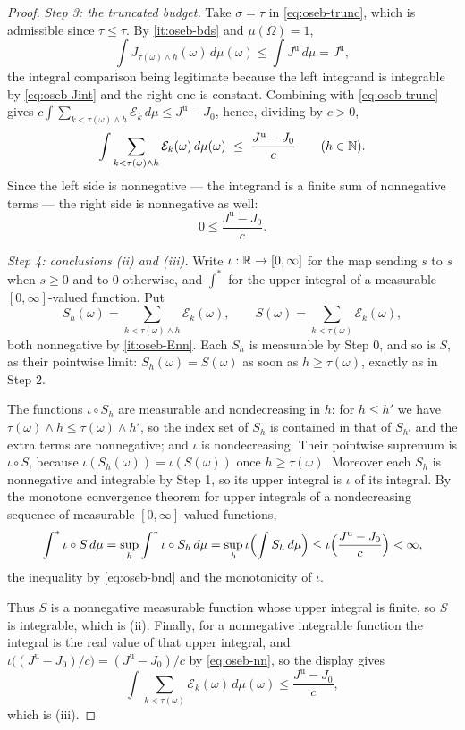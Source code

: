 \begin{proof}
\emph{Step 3: the truncated budget.} Take $\sigma=\tau$ in
\eqref{eq:oseb-trunc}, which is admissible since $\tau\le\tau$. By
\ref{it:oseb-bds} and $\mu(\Omega)=1$,
\[
  \int J_{\tau(\omega)\wedge h}(\omega)\,d\mu(\omega)
   \le\int J^{\mathrm u}\,d\mu=J^{\mathrm u},
\]
the integral comparison being legitimate because the left integrand is
integrable by \eqref{eq:oseb-Jint} and the right one is constant. Combining
with \eqref{eq:oseb-trunc} gives
$c\int\sum_{k<\tau(\omega)\wedge h}\mathcal E_k\,d\mu\le J^{\mathrm u}-J_0$,
hence, dividing by $c>0$,
\begin{equation}\label{eq:oseb-bnd}
  \int\sum_{k<\tau(\omega)\wedge h}\mathcal E_k(\omega)\,d\mu(\omega)
   \ \le\ \frac{J^{\mathrm u}-J_0}{c}\qquad(h\in\mathbb{N}).
\end{equation}
Since the left side is nonnegative --- the integrand is a finite sum of
nonnegative terms --- the right side is nonnegative as well:
\begin{equation}\label{eq:oseb-nn}
  0\le\frac{J^{\mathrm u}-J_0}{c}.
\end{equation}

\emph{Step 4: conclusions (ii) and (iii).} Write $\iota:\mathbb{R}\to[0,\infty]$ for
the map sending $s$ to $s$ when $s\ge0$ and to $0$ otherwise, and $\int^{*}$
for the upper integral of a measurable $[0,\infty]$-valued function. Put
\[
  S_h(\omega)=\sum_{k<\tau(\omega)\wedge h}\mathcal E_k(\omega),
  \qquad
  S(\omega)=\sum_{k<\tau(\omega)}\mathcal E_k(\omega),
\]
both nonnegative by \ref{it:oseb-Enn}. Each $S_h$ is measurable by Step 0, and
so is $S$, as their pointwise limit: $S_h(\omega)=S(\omega)$ as soon as
$h\ge\tau(\omega)$, exactly as in Step 2.

The functions $\iota\circ S_h$ are measurable and nondecreasing in $h$: for
$h\le h'$ we have $\tau(\omega)\wedge h\le\tau(\omega)\wedge h'$, so the index
set of $S_h$ is contained in that of $S_{h'}$ and the extra terms are
nonnegative; and $\iota$ is nondecreasing. Their pointwise supremum is
$\iota\circ S$, because $\iota(S_h(\omega))=\iota(S(\omega))$ once
$h\ge\tau(\omega)$. Moreover each $S_h$ is nonnegative and integrable by
Step 1, so its upper integral is $\iota$ of its integral. By the monotone
convergence theorem for upper integrals of a nondecreasing sequence of
measurable $[0,\infty]$-valued functions,
\[
  \int^{*}\iota\circ S\,d\mu
   =\sup_h\int^{*}\iota\circ S_h\,d\mu
   =\sup_h\iota\Bigl(\int S_h\,d\mu\Bigr)
   \le\iota\Bigl(\frac{J^{\mathrm u}-J_0}{c}\Bigr)<\infty ,
\]
the inequality by \eqref{eq:oseb-bnd} and the monotonicity of $\iota$.

Thus $S$ is a nonnegative measurable function whose upper integral is finite,
so $S$ is integrable, which is (ii). Finally, for a nonnegative integrable
function the integral is the real value of that upper integral, and
$\iota\bigl((J^{\mathrm u}-J_0)/c\bigr)=(J^{\mathrm u}-J_0)/c$ by
\eqref{eq:oseb-nn}, so the display gives
\[
  \int\sum_{k<\tau(\omega)}\mathcal E_k(\omega)\,d\mu(\omega)
   \le\frac{J^{\mathrm u}-J_0}{c},
\]
which is (iii).
\end{proof}
